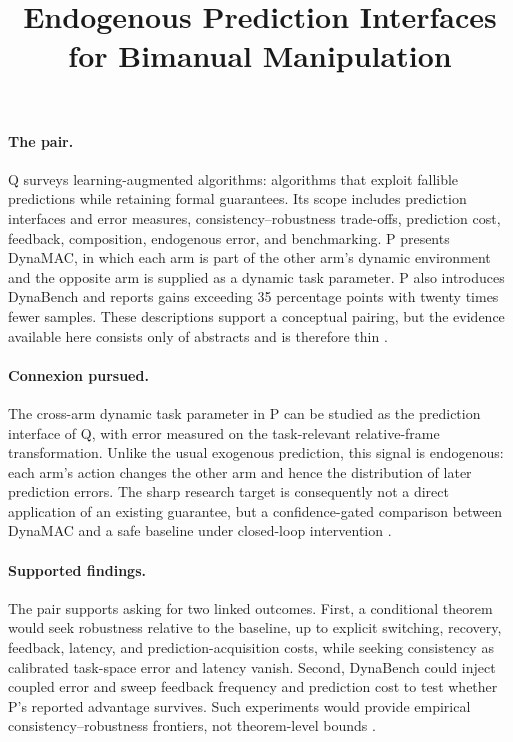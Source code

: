 \documentclass{article}
\title{Endogenous Prediction Interfaces for Bimanual Manipulation}
\begin{document}
\maketitle

\paragraph{The pair.}
Q surveys learning-augmented algorithms: algorithms that exploit fallible predictions while retaining formal guarantees.  Its scope includes prediction interfaces and error measures, consistency--robustness trade-offs, prediction cost, feedback, composition, endogenous error, and benchmarking.  P presents DynaMAC, in which each arm is part of the other arm's dynamic environment and the opposite arm is supplied as a dynamic task parameter.  P also introduces DynaBench and reports gains exceeding 35 percentage points with twenty times fewer samples.  These descriptions support a conceptual pairing, but the evidence available here consists only of abstracts and is therefore thin .

\paragraph{Connexion pursued.}
The cross-arm dynamic task parameter in P can be studied as the prediction interface of Q, with error measured on the task-relevant relative-frame transformation.  Unlike the usual exogenous prediction, this signal is endogenous: each arm's action changes the other arm and hence the distribution of later prediction errors.  The sharp research target is consequently not a direct application of an existing guarantee, but a confidence-gated comparison between DynaMAC and a safe baseline under closed-loop intervention .

\paragraph{Supported findings.}
The pair supports asking for two linked outcomes.  First, a conditional theorem would seek robustness relative to the baseline, up to explicit switching, recovery, feedback, latency, and prediction-acquisition costs, while seeking consistency as calibrated task-space error and latency vanish.  Second, DynaBench could inject coupled error and sweep feedback frequency and prediction cost to test whether P's reported advantage survives.  Such experiments would provide empirical consistency--robustness frontiers, not theorem-level bounds .
\end{document}
